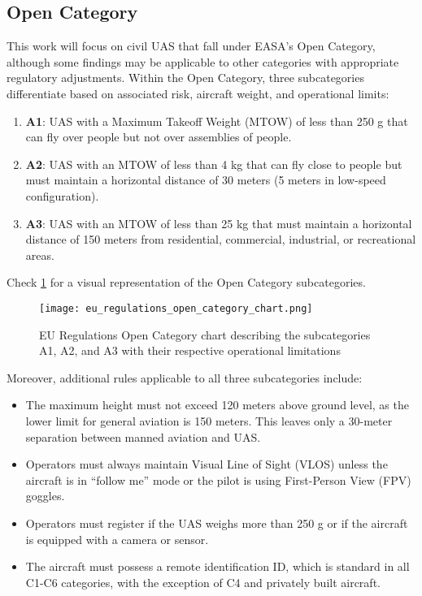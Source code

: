 \subsection{Open Category}
This work will focus on civil UAS that fall under EASA's Open Category, although some findings may be applicable to other categories with appropriate regulatory adjustments. Within the Open Category, three subcategories differentiate based on associated risk, aircraft weight, and operational limits:

\begin{enumerate}
  \item \textbf{A1}: UAS with a Maximum Takeoff Weight (MTOW) of less than 250 g that can fly over people but not over assemblies of people.

  \item \textbf{A2}: UAS with an MTOW of less than 4 kg that can fly close to people but must maintain a horizontal distance of 30 meters (5 meters in low-speed configuration).

  \item \textbf{A3}: UAS with an MTOW of less than 25 kg that must maintain a horizontal distance of 150 meters from residential, commercial, industrial, or recreational areas.
\end{enumerate}

Check \cref{fig:eu_regulations_open_category_chart} for a visual representation of the Open Category subcategories.

\begin{figure}
  \texttt{[image: eu\_regulations\_open\_category\_chart.png]}
  \caption{EU Regulations Open Category chart describing the subcategories A1, A2, and A3 with their respective operational limitations \autocite{ageagleEuropeanUnion}}
  \label{fig:eu_regulations_open_category_chart}
\end{figure}

Moreover, additional rules applicable to all three subcategories include:

\begin{itemize}
  \item The maximum height must not exceed 120 meters above ground level, as the lower limit for general aviation is 150 meters. This leaves only a 30-meter separation between manned aviation and UAS.

  \item Operators must always maintain Visual Line of Sight (VLOS) unless the aircraft is in ``follow me'' mode or the pilot is using First-Person View (FPV) goggles.

  \item Operators must register if the UAS weighs more than 250 g or if the aircraft is equipped with a camera or sensor.

  \item The aircraft must possess a remote identification ID, which is standard in all C1-C6 categories, with the exception of C4 and privately built aircraft.
\end{itemize}
